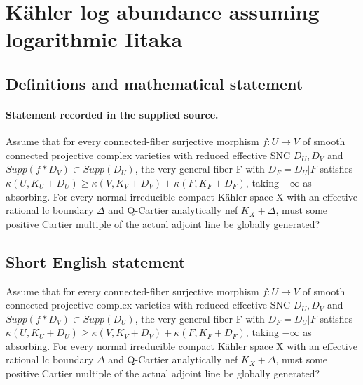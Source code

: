 \documentclass[11pt]{article}
\begin{document}
\section*{Kähler log abundance assuming logarithmic Iitaka}\label{statement}
\subsection{Definitions and mathematical statement}
\paragraph{Statement recorded in the supplied source.}
Assume that for every connected-fiber surjective morphism $f:U\to V$ of smooth connected projective complex varieties with reduced effective SNC $D_U,D_V$ and $Supp(f*D_V)\subset Supp(D_U)$, the very general fiber F with $D_F=D_U|F$ satisfies $\kappa (U,K_U+D_U)\geq \kappa (V,K_V+D_V)+\kappa (F,K_F+D_F)$, taking $-\infty $ as absorbing. For every normal irreducible compact Kähler space X with an effective rational lc boundary $\Delta $ and Q-Cartier analytically nef $K_X+\Delta $, must some positive Cartier multiple of the actual adjoint line be globally generated?
\subsection{Short English statement}
Assume that for every connected-fiber surjective morphism $f:U\to V$ of smooth connected projective complex varieties with reduced effective SNC $D_U,D_V$ and $Supp(f*D_V)\subset Supp(D_U)$, the very general fiber F with $D_F=D_U|F$ satisfies $\kappa (U,K_U+D_U)\geq \kappa (V,K_V+D_V)+\kappa (F,K_F+D_F)$, taking $-\infty $ as absorbing. For every normal irreducible compact Kähler space X with an effective rational lc boundary $\Delta $ and Q-Cartier analytically nef $K_X+\Delta $, must some positive Cartier multiple of the actual adjoint line be globally generated?
\end{document}
